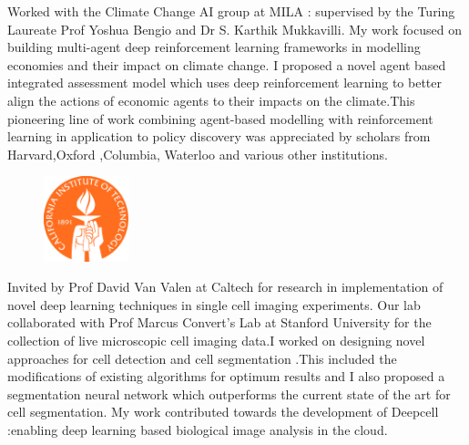 \documentclass[]{deedy-resume-openfont}
\begin{document}
\begin{minipage}[t]{0.66\textwidth}
Worked with the Climate Change AI group at MILA : supervised by the Turing Laureate Prof Yoshua Bengio and Dr S. Karthik Mukkavilli. My work focused on building multi-agent deep reinforcement learning frameworks in modelling economies and their impact on climate change. I proposed a novel agent based integrated assessment model which uses deep reinforcement learning to better align the actions of economic agents to their impacts on the climate.This pioneering line of work combining agent-based modelling with reinforcement learning in application to policy discovery was appreciated by scholars from Harvard,Oxford ,Columbia, Waterloo and various other institutions.  

\sectionsep

\begin{figure}
  \begin{center}
    \includegraphics[width=0.22\textwidth]{caltechlogo.png}
  \end{center}
\end{figure}
Invited by Prof David Van Valen at Caltech for research in implementation of novel deep learning techniques in single cell imaging experiments. Our lab collaborated with Prof Marcus Convert's Lab at Stanford University for the collection of live microscopic cell imaging data.I worked on designing novel approaches for cell detection and cell segmentation .This included the modifications of existing algorithms for optimum results and I also proposed a segmentation neural network which outperforms the current state of the art for cell segmentation. My work contributed towards the development of Deepcell :enabling deep learning based biological image analysis in the cloud. 
\sectionsep


\end{minipage}
\end{document}
